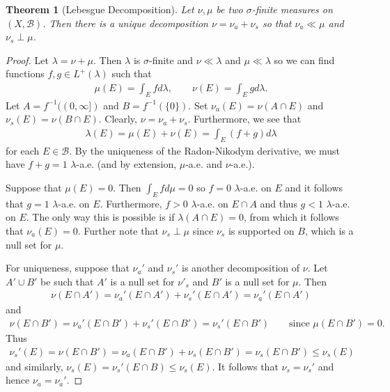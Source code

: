 \documentclass[11pt]{amsart}
\newtheorem{theorem}{Theorem}[section]
\theoremstyle{definition}
\numberwithin{equation}{section}
\begin{document}
\begin{theorem}[Lebesgue Decomposition]
    Let $\nu,\mu$ be two $\sigma$-finite measures on $(X,\mathcal B)$. Then there is a unique decomposition $\nu=\nu_a+\nu_s$ so that $\nu_a\ll \mu$ and $\nu_s\perp \mu$.
\end{theorem}
\begin{proof}
    Let $\lambda=\nu+\mu$. Then $\lambda$ is $\sigma$-finite and $\nu\ll \lambda$ and $\mu\ll \lambda$ so we can find functions $f,g\in L^+(\lambda)$ such that
    \begin{align*}
        \mu(E)=\int_Efd\lambda,\qquad\nu(E)=\int_Egd\lambda.
    \end{align*}
    Let $A=f^{-1}((0,\infty])$ and $B=f^{-1}(\{0\})$. Set $\nu_a(E)=\nu(A\cap E)$ and $\nu_s(E)=\nu(B\cap E)$. Clearly, $\nu=\nu_a+\nu_s$. Furthermore, we see that
    \begin{align*}
        \lambda(E)=\mu(E)+\nu(E)=\int_E(f+g)d\lambda
    \end{align*}
    for each $E\in\mathcal B$. By the uniqueness of the Radon-Nikodym derivative, we must have $f+g=1$ $\lambda$-a.e. (and by extension, $\mu$-a.e. and $\nu$-a.e.).
    
    Suppose that $\mu(E)=0$. Then $\int_Efd\mu=0$ so $f=0$ $\lambda$-a.e. on $E$ and it follows that $g=1$ $\lambda$-a.e. on $E$. Furthermore, $f>0$ $\lambda$-a.e. on $E\cap A$ and thus $g<1$ $\lambda$-a.e. on $E$. The only way this is possible is if $\lambda(A\cap E)=0$, from which it follows that $\nu_a(E)=0$. Further note that $\nu_s\perp \mu$ since $\nu_s$ is supported on $B$, which is a null set for $\mu$.

    For uniqueness, suppose that $\nu_a'$ and $\nu_s'$ is another decomposition of $\nu$. Let $A'\cup B'$ be such that $A'$ is a null set for $\nu'_s$ and $B'$ is a null set for $\mu$. Then
    \begin{align*}
        \nu(E\cap A')=\nu_a'(E\cap A')+\nu_s'(E\cap A')=\nu_a'(E\cap A')
    \end{align*}
    and
    \begin{align*}
        \nu(E\cap B')=\nu_a'(E\cap B')+\nu_s'(E\cap B')=\nu_s'(E\cap B')\qquad\text{since }\mu(E\cap B')=0.
    \end{align*}
    Thus
    \begin{align*}
        \nu_s'(E)=\nu(E\cap B')=\nu_a(E\cap B')+\nu_s(E\cap B')=\nu_s(E\cap B')\le \nu_s(E)
    \end{align*}
    and similarly, $\nu_s(E)=\nu_s'(E\cap B)\le \nu_s(E)$. It follows that $\nu_s=\nu_s'$ and hence $\nu_a=\nu_a'$.
\end{proof}
\end{document}
